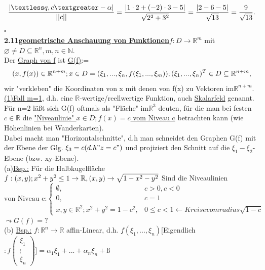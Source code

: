 \documentclass[]{scrartcl}
\newcommand{\redcircle}[1]{%
	\tikz[baseline=(char.base)]{
		\node[shape=circle, draw=red, text=red, thick, inner sep=1pt] (char) 
		{\textbf{#1}};
	}%
}
\begin{document}
\begin{equation}
	\frac{|\textless q,c 
	\textgreater-\alpha|}{||c||}=\frac{|1\cdot2+(-2)\cdot3-5|}{\sqrt{2^2+3^2}}=
	\frac{|2-6-5|}{\sqrt{13}}=\frac{9}{\sqrt{13}}.
\end{equation}
\hfill$\square$\\
\textbf{2.11\underline{geometrische Anschauung von 
Funktionen}}$f:D\rightarrow\mathbb{R}^m$ mit $ \varnothing \neq D \subseteq 
\mathbb{R}^n,m,n\in\mathbb{N}.$\\
Der \ul{Graph von f} ist 
\ul{G(f)}:=\begin{equation}
	{(x,f(x))\in \mathbb{R}^{n+m};x\in D}\\
	={(\xi_1,...,\xi_n,f(\xi_1,...,\xi_m));(\xi_1,...,\xi_n)^T\in D}\subseteq 
	\mathbb{R}^{n+m},
\end{equation}
wir "verkleben" die Koordinaten von x mit denen von f(x) zu Vektoren 
im$\mathbb{R}^{n+m}$.\\
\underline{(1)Fall m=1}, d.h. eine $\mathbb{R}$-wertige/reellwertige Funktion, 
auch  \ul{Skalarfeld} genannt.\\
Für n=2 läßt sich G(f) oftmals als "Fläche" im$\mathbb{R}^3$ deuten, für die 
man bei festen $c \in \mathbb{R}$ die \ul{"Niveaulinie" ${x\in D;f(x)=c}$ vom 
Niveau c} betrachten kann (wie Höhenlinien bei Wanderkarten).\\
Dabei macht man "Horizontalschnitte", d.h man schneidet den Graphen G(f) mit 
der Ebene
der Glg. $\xi_3= c(d.h"z=c")$ und projiziert den Schnitt auf die 
$\xi_1-\xi_2$-Ebene (bzw. xy-Ebene).\\
(a)\underline{Bsp.:} Für die Halbkugelfläche $f:{(x,y); x^2+y^2\leq 
1}\rightarrow\mathbb{R}, (x,y)\rightarrow \sqrt{1-x^2-y^2}\\$
Sind die Niveaulinien\\
\begin{equation}
	\text{von Niveau c:}\begin{cases}
		\emptyset, & c>0,c<0\\
		{0}, & c=1\\
		{x,y}\in \mathbb{R}^2;x^2+y^2=1-c^2, & 0\leq c<1\leftarrow Kreise vom 
		radius\sqrt{1-c}
	\end{cases}
\end{equation}
$\leadsto G(f)=?$\redcircle{Ü}\\
(b) \underline{Bsp.:} $f:\mathbb{R}^n\rightarrow\mathbb{R}$ affin-Linear, d.h.
$f(\xi_1,...,\xi_n)[$Eigendlich$: f\begin{pmatrix}
	\xi_1\\
	\vdots\\
	\xi_n
\end{pmatrix}]= \alpha_1\xi_1+...+\alpha_n\xi_n+ß$
\end{document}
